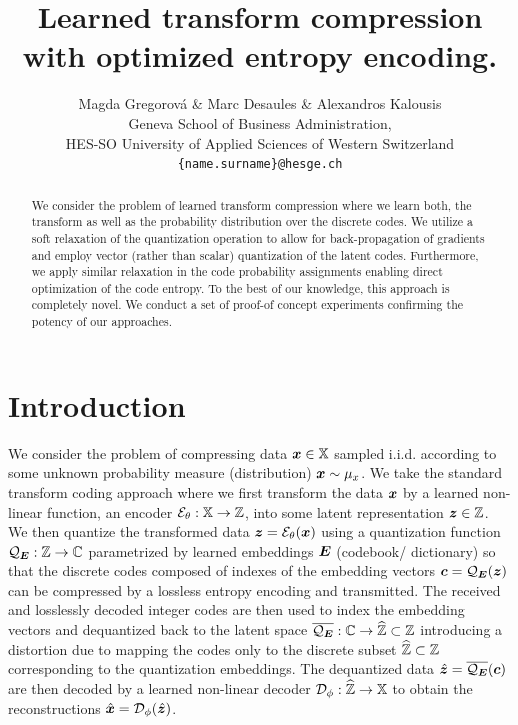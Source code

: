 \documentclass{article} %
\title{Learned transform compression with optimized entropy encoding.}
\author{Magda Gregorová \& Marc Desaules \& Alexandros Kalousis \\
Geneva School of Business Administration, \\
HES-SO University of Applied Sciences of Western Switzerland \\
\texttt{\{name.surname\}@hesge.ch} \\
}
\newcommand{\mux}{\mu_x}
\newcommand{\gEt}{\gE_\theta}
\newcommand{\gQE}{\gQ_\mE}
\newcommand{\gDp}{\gD_\phi}
\newcommand{\vzh}{\hat{\vz}}
\newcommand{\vxh}{\hat{\vx}}
\begin{document}
\maketitle

\begin{abstract}
We consider the problem of learned transform compression where we learn both, the transform as well as the probability distribution over the discrete codes.
We utilize a soft relaxation of the quantization operation to allow for back-propagation of gradients and employ vector (rather than scalar) quantization of the latent codes.
Furthermore, we apply similar relaxation in the code probability assignments enabling direct optimization of the code entropy.
To the best of our knowledge, this approach is completely novel.
We conduct a set of proof-of concept experiments confirming the potency of our approaches.
\end{abstract}

\section{Introduction}\label{sec:Intro}

We consider the problem of compressing data ${\bm{x}} \in {\mathbb{X}}$ sampled i.i.d. according to some unknown probability measure (distribution) $\vx \sim \mux$.
We take the standard transform coding \citep{sayoodIntroductionDataCompression2012} approach where we first transform the data ${\bm{x}}$ by a learned non-linear function, an encoder $\gEt : \sX \to \sZ$, into some latent representation ${\bm{z}} \in {\mathbb{Z}}$.
We then quantize the transformed data $\vz = \gEt(\vx)$ using a quantization function $\gQE : \sZ \to \sC$ parametrized by learned embeddings ${\bm{E}}$ (codebook/ dictionary) so that the discrete codes composed of indexes of the embedding vectors $\vc = \gQE(\vz)$ can be compressed by a lossless entropy encoding and transmitted.
The received and losslessly decoded integer codes are then used to index the embedding vectors and dequantized back to the latent space $\overline{\gQE} : \sC \to \widehat{\sZ} \subset \sZ$ introducing a distortion due to mapping the codes only to the discrete subset $\widehat{{\mathbb{Z}}} \subset {\mathbb{Z}}$ corresponding to the quantization embeddings.
The dequantized data $\vzh = \overline{\gQE}(\vc)$ are then decoded by a learned non-linear decoder $\gDp : \widehat{\sZ} \to \sX$ to obtain the reconstructions $\vxh = \gDp(\vzh)$.
\end{document}
